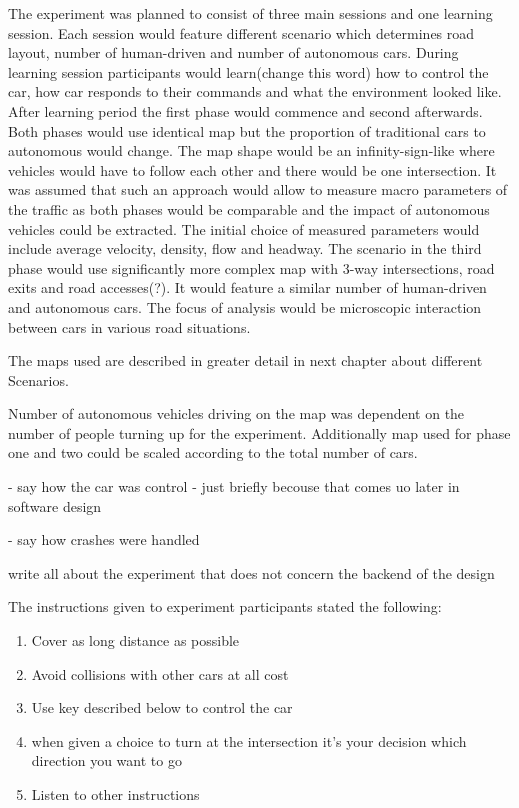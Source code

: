 \documentclass[11pt]{article}
\begin{document}
The experiment was planned to consist of three main sessions and one learning session. Each session would feature different scenario which determines road layout, number of human-driven and number of autonomous cars. During learning session participants would learn(change this word) how to control the car, how car responds to their commands and what the environment looked like. 
After learning period the first phase would commence and second afterwards. Both phases would use identical map but the proportion of traditional cars to autonomous would change. The map shape would be an infinity-sign-like where vehicles would have to follow each other and there would be one intersection. It was assumed that such an approach would allow to measure macro parameters of the traffic as both phases would be comparable and the impact of autonomous vehicles could be extracted. The initial choice of measured parameters would include average velocity, density, flow and headway. 
The scenario in the third phase would use significantly more complex map with 3-way  intersections, road exits and road accesses(?). It would feature a similar number of human-driven and autonomous cars. The focus of analysis would be microscopic interaction between cars in various road situations. 

  


The maps used are described in greater detail in next chapter about different Scenarios.


Number of autonomous vehicles driving on the map was dependent on the number of people turning up for the experiment. Additionally map used for phase one and two could be scaled according to the total number of cars.



- say how the car was control - just briefly becouse that comes uo later in software design 


- say how crashes were handled


write all about the experiment that does not concern the backend of the design


The instructions given to experiment participants stated the following:

\begin{enumerate}
  \item Cover as long distance as possible
  \item Avoid collisions with other cars at all cost
  \item Use key described below to control the car
  \item when given a choice to turn at the intersection it's your decision which direction you want to go
  \item Listen to other instructions
\end{enumerate}
\end{document}
